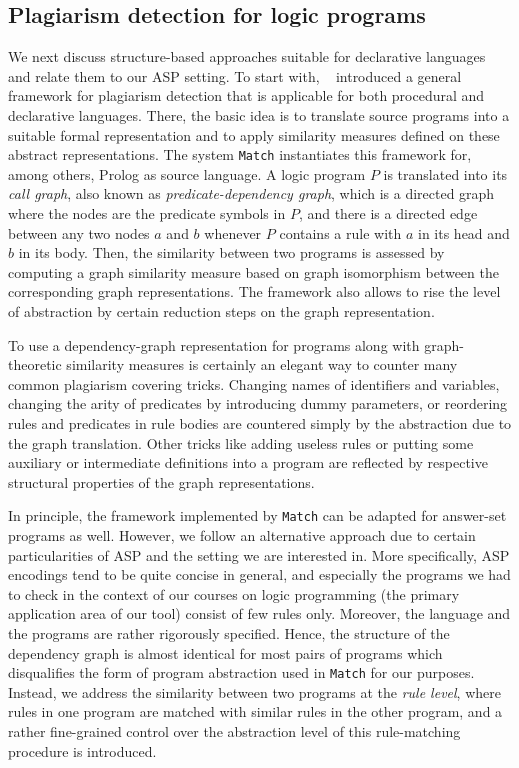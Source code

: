 \documentclass{tlp}
\begin{document}
\subsection{Plagiarism detection  for logic programs}
We next discuss structure-based approaches suitable for declarative languages and relate them to our ASP setting.
To start with, ~ introduced a general framework for plagiarism detection that is applicable for
both procedural and declarative languages. 
There, the basic idea is to translate  source programs into a suitable formal representation and to apply similarity measures defined on these abstract representations. 
The system {\tt Match} instantiates this framework for, among others, Prolog  as source language.
A logic program $P$  is translated into its \emph{call graph}, also known as \emph{predicate-dependency graph}, which is 
a directed graph  where the nodes are the predicate symbols in $P$, and there is a directed edge between any  two
nodes $a$ and $b$ whenever $P$ contains a rule with $a$ in its head and $b$ in its body.
Then, the similarity between two programs is assessed by computing a graph similarity measure based on graph isomorphism
between the corresponding graph representations. 
The framework also allows to rise the level of abstraction by certain reduction steps on the graph representation. 

To use a dependency-graph representation for programs along with graph-theoretic similarity measures is certainly
an elegant way to counter many common plagiarism covering tricks. 
Changing names of identifiers and variables, changing the arity of  predicates by introducing dummy parameters, or
reordering rules and predicates in rule bodies 
are countered simply by the abstraction due to the graph translation. Other tricks like adding useless rules  or putting
some auxiliary or intermediate definitions into a program are reflected by respective structural properties of the graph representations.

In principle, the framework implemented by {\tt Match} can be adapted for answer-set programs as well. 
However, we follow an alternative approach 
due to certain particularities of ASP and the 
setting we are interested in. 
More specifically,  ASP encodings tend to be quite concise in general, and especially the programs we had to check in the context of our courses on logic
programming (the primary application area of our tool) consist of few rules only. Moreover, the language and the 
programs are rather rigorously specified. 
Hence, the structure of the dependency graph is almost identical for most pairs of programs which disqualifies the form of program abstraction used in {\tt Match} for our purposes.   
Instead, we address the similarity between two programs at the \emph{rule level}, where rules in one program are matched with
 similar rules in the other program, and a rather fine-grained control over the abstraction level of this
rule-matching procedure is introduced.
 
\end{document}
